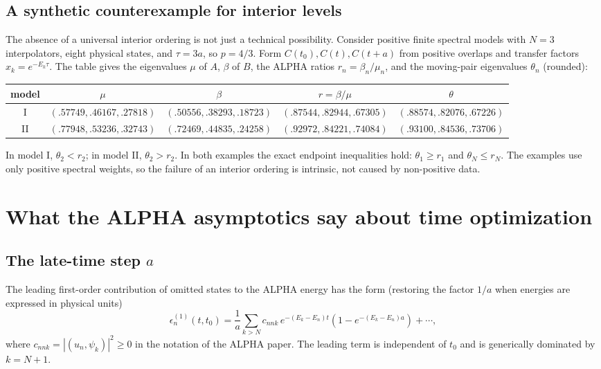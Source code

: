 \documentclass[11pt]{article}
\begin{document}
\subsection{A synthetic counterexample for interior levels}
The absence of a universal interior ordering is not just a technical possibility. Consider positive finite spectral models with $N=3$ interpolators, eight physical states, and $\tau=3a$, so $p=4/3$. Form $C(t_0),C(t),C(t+a)$ from positive overlaps and transfer factors $x_k=e^{-E_k\tau}$. The table gives the eigenvalues $\mu$ of $A$, $\beta$ of $B$, the ALPHA ratios $r_n=\beta_n/\mu_n$, and the moving-pair eigenvalues $\theta_n$ (rounded):
\begin{center}
\small
\begin{tabular}{c|c|c|c|c}
\toprule
model & $\mu$ & $\beta$ & $r=\beta/\mu$ & $\theta$\\
\midrule
I & $(.57749,.46167,.27818)$ & $(.50556,.38293,.18723)$ & $(.87544,.82944,.67305)$ & $(.88574,.82076,.67226)$\\
II & $(.77948,.53236,.32743)$ & $(.72469,.44835,.24258)$ & $(.92972,.84221,.74084)$ & $(.93100,.84536,.73706)$\\
\bottomrule
\end{tabular}
\end{center}
In model I, $\theta_2<r_2$; in model II, $\theta_2>r_2$. In both examples the exact endpoint inequalities hold: $\theta_1\geq r_1$ and $\theta_N\leq r_N$. The examples use only positive spectral weights, so the failure of an interior ordering is intrinsic, not caused by non-positive data.

\section{What the ALPHA asymptotics say about time optimization}
\subsection{The late-time step $a$}
The leading first-order contribution of omitted states to the ALPHA energy has the form (restoring the factor $1/a$ when energies are expressed in physical units)
\begin{equation}
\epsilon_n^{(1)}(t,t_0)
=\frac1a\sum_{k>N}c_{nnk}\,e^{-(E_k-E_n)t}
\left(1-e^{-(E_k-E_n)a}\right)+\cdots,
\label{eq:firstorder}
\end{equation}
where $c_{nnk}=|(u_n,\psi_k)|^2\geq0$ in the notation of the ALPHA paper. The leading term is independent of $t_0$ and is generically dominated by $k=N+1$.
\end{document}
